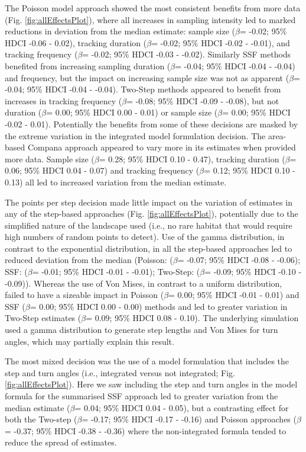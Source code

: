 \documentclass[10pt,a4paper]{article}
\begin{document}
The Poisson model approach showed the most consistent benefits from more data (Fig. \ref{fig:allEffectsPlot}), where all increases in sampling intensity led to marked reductions in deviation from the median estimate: sample size (\(\beta\)= -0.02; 95\% HDCI -0.06 - 0.02), tracking duration (\(\beta\)= -0.02; 95\% HDCI -0.02 - -0.01), and tracking frequency (\(\beta\)= -0.02; 95\% HDCI -0.03 - -0.02).
Similarly SSF methods benefited from increasing sampling duration (\(\beta\)= -0.04; 95\% HDCI -0.04 - -0.04) and frequency, but the impact on increasing sample size was not as apparent (\(\beta\)= -0.04; 95\% HDCI -0.04 - -0.04).
Two-Step methods appeared to benefit from increases in tracking frequency (\(\beta\)= -0.08; 95\% HDCI -0.09 - -0.08), but not duration (\(\beta\)= 0.00; 95\% HDCI 0.00 - 0.01) or sample size (\(\beta\)= 0.00; 95\% HDCI -0.02 - 0.01).
Potentially the benefits from some of these decisions are masked by the extreme variation in the integrated model formulation decision.
The area-based Compana approach appeared to vary more in its estimates when provided more data.
Sample size (\(\beta\)= 0.28; 95\% HDCI 0.10 - 0.47), tracking duration (\(\beta\)= 0.06; 95\% HDCI 0.04 - 0.07) and tracking frequency (\(\beta\)= 0.12; 95\% HDCI 0.10 - 0.13) all led to increased variation from the median estimate.

The points per step decision made little impact on the variation of estimates in any of the step-based approaches (Fig. \ref{fig:allEffectsPlot}), potentially due to the simplified nature of the landscape used (i.e., no rare habitat that would require high numbers of random points to detect).
Use of the gamma distribution, in contrast to the exponential distribution, in all the step-based approaches led to reduced deviation from the median (Poisson: (\(\beta\)= -0.07; 95\% HDCI -0.08 - -0.06); SSF: (\(\beta\)= -0.01; 95\% HDCI -0.01 - -0.01); Two-Step: (\(\beta\)= -0.09; 95\% HDCI -0.10 - -0.09)).
Whereas the use of Von Mises, in contrast to a uniform distribution, failed to have a sizeable impact in Poisson (\(\beta\)= 0.00; 95\% HDCI -0.01 - 0.01) and SSF (\(\beta\)= 0.00; 95\% HDCI 0.00 - 0.00) methods and led to greater variation in Two-Step estimates (\(\beta\)= 0.09; 95\% HDCI 0.08 - 0.10).
The underlying simulation used a gamma distribution to generate step lengths and Von Mises for turn angles, which may partially explain this result.

The most mixed decision was the use of a model formulation that includes the step and turn angles (i.e., integrated versus not integrated; Fig. \ref{fig:allEffectsPlot}).
Here we saw including the step and turn angles in the model formula for the summarised SSF approach led to greater variation from the median estimate (\(\beta\)= 0.04; 95\% HDCI 0.04 - 0.05), but a contrasting effect for both the Two-step (\(\beta\)= -0.17; 95\% HDCI -0.17 - -0.16) and Poisson approaches (\(\beta\)= -0.37; 95\% HDCI -0.38 - -0.36) where the non-integrated formula tended to reduce the spread of estimates.
\end{document}
